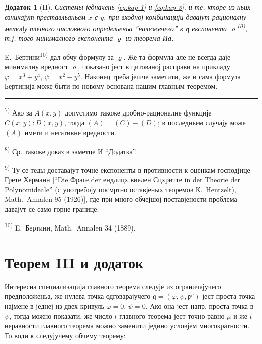 \documentclass[11pt]{article}
\newcommand{\foreign}[1]{#1}
\theoremstyle{plain}
\newtheorem{zusatz}{Додаток}
\begin{document}
\begin{zusatz}[II]
Системы једначень \eqref{eq:kap-1} и \eqref{eq:kap-3}, и те, кторе
из ньих взникајут преставльаньем $x$ с $y$, при входној комбинацији
давајут рационалну методу точного числовного определьеньа
``належечего'' к $\mathfrak{q}$ експонента
$\varrho$\textsuperscript{10)}, т.ј. того минималного експонента
$\varrho$ из теорема Иа.
\end{zusatz}

E.\ Бертини\textsuperscript{10)} дал обчу формулу за $\varrho$.
Же та формула але не всегда даје минималну вредност $\varrho$,
показано јест в цитованој расправи на прикладу
$\varphi = x^{3} + y^{4}$, $\psi = x^{2} - y^{5}$. Наконец треба
јешче заметити, же и сама формула Бертинија може быти по новому
основана нашим главным теоремом.

\vspace{0.5em}
\noindent\rule{\textwidth}{0.4pt}
\vspace{0.3em}

{\footnotesize
\textsuperscript{7)} Ако за $A(x,y)$ допустимо такоже дробно-рационалне
функције $C(x,y):D(x,y)$, тогда $(A) = (C) - (D)$; в последньем
случају може $(A)$ имети и негативне вредности.

\textsuperscript{8)} Ср. такоже доказ в заметце И ``Додатка''.

\textsuperscript{9)} Ту се теды доставајут точне експоненты в противности к
оценкам господјице Грете Херманн [``Die Фраге der ендлицх виелен Сцхритте
in der Theorie der Polynomideale'' (с употребоју посмртно оставјеных
теоремов К.\ Hentzelt), \foreign{Math.\ Annalen} 95 (1926)], где при
много обчејшој поставјености проблема давајут се само горне границе.

\textsuperscript{10)} E.\ Бертини, \foreign{Math.\ Annalen} 34 (1889).
}

\newpage
\section*{Теорем III и додаток}

Интересна специализација главного теорема следује из ограничајучего
предположеньа, же нулева точка одговарајучего
$\mathfrak{q} = (\varphi, \psi, \mathfrak{p}^{\varrho})$ јест проста
точка најмене в једнеј из двех кривуль $\varphi = 0$, $\psi = 0$.
Ако она јест напр. проста точка в $\psi$, тогда можно показати, же
число $t$ главного теорема јест точно равно $\mu$ и же $t$
неравности главного теорема можно заменити једино условјем
многократности. То води к следујучему обчему теорему:
\end{document}
